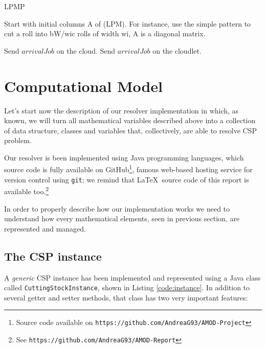\documentclass[10pt,a4paper]{article}
\begin{document}
\begin{algorithm}

\caption{}\label{alg:accessControlAlgorithm1}

\begin{algorithmic}


LPMP

Start with initial columns A of (LPM). For instance, use the simple pattern to cut a roll into bW/wic rolls of width wi, A is a diagonal matrix.



	\State Send $\textit{arrivalJob}$ on the cloud.
\Else 	
 	\State Send $\textit{arrivalJob}$ on the cloudlet.
\EndIf

\EndFunction

\end{algorithmic}

\end{algorithm}

\clearpage
\newpage
\section{Computational Model}

Let's start now the description of our resolver implementation in which, as known, we will turn all mathematical variables described above into a collection of data structure, classes and variables that, collectively, are able to resolve CSP problem.

Our resolver is been implemented using Java programming languages, which source code is fully available on GitHub\footnote{Source code available on \texttt{https://github.com/AndreaG93/AMOD-Project}}, famous web-based hosting service for version control using \texttt{git}; we remind that \LaTeX\ source code of this report is available too.\footnote{See \texttt{https://github.com/AndreaG93/AMOD-Report}}

In order to properly describe how our implementation works we need to understand how every mathematical elements, seen in previous section, are represented and managed.

\subsection{The CSP instance}

A \textit{generic} CSP instance has been implemented and represented using a Java class called \texttt{CuttingStockInstance}, shown in Listing \ref{code:instance}. In addition to several getter and setter methods, that class has two very important features: 
\end{document}
